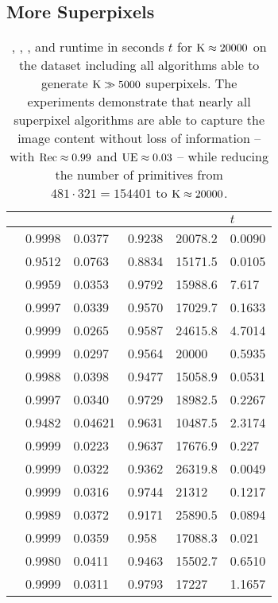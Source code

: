 \subsection{More Superpixels}
\label{subsec:experiments-k}

\begin{table}[t]
	\centering
	{\scriptsize
	\begin{tabular}{| r | l | l | l | l | l |}
		\hline
		& \Rec & \UE & \EV & \K & $t$\\\hline
		\W & 0.9998 & 0.0377 & 0.9238 & 20078.2 & 0.0090\\
		\PF & 0.9512 & 0.0763 & 0.8834 & 15171.5 & 0.0105\\
		\CIS & 0.9959 & 0.0353 & 0.9792 & 15988.6 & 7.617\\
		\SLIC & 0.9997 & 0.0339 & 0.9570 & 17029.7 & 0.1633\\
		\CRS & 0.9999 & 0.0265 & 0.9587 & 24615.8 & 4.7014\\
		\ERS & 0.9999 & 0.0297 & 0.9564 & 20000 & 0.5935\\
		\PB & 0.9988 & 0.0398 & 0.9477 & 15058.9 & 0.0531\\
		\SEEDS & 0.9997 & 0.0340 & 0.9729 & 18982.5 & 0.2267\\
		\VC & 0.9482 & 0.04621 & 0.9631 & 10487.5 & 2.3174\\
		\CCS & 0.9999 & 0.0223 & 0.9637 & 17676.9 & 0.227\\
		\CW & 0.9999 & 0.0322 & 0.9362 & 26319.8 & 0.0049\\
		\ERGC & 0.9999 & 0.0316 & 0.9744 & 21312 & 0.1217\\
		\MSS & 0.9989 & 0.0372 & 0.9171 & 25890.5 & 0.0894\\
		\preSLIC & 0.9999 & 0.0359 & 0.958 & 17088.3 & 0.021\\
		\WP & 0.9980 & 0.0411 & 0.9463 & 15502.7 & 0.6510\\
		\ETPS & 0.9999 & 0.0311 & 0.9793 & 17227 & 1.1657\\\hline
	\end{tabular}
	}
	\caption{\Rec, \UE, \EV, \K and runtime in seconds $t$ for $\text{K} \approx 20000$
	on the \BSDS dataset including all algorithms able to generate $\text{K} \gg 5000$ superpixels.
	The experiments demonstrate that nearly all superpixel algorithms are able to
	capture the image content without loss of information -- with $\text{Rec} \approx 0.99$ and $\text{UE} \approx 0.03$
	-- while reducing the number of primitives from $481 \cdot 321 = 154401$ to $\text{K} \approx 20000$.}
	\label{table:experiments-k}
\end{table}

